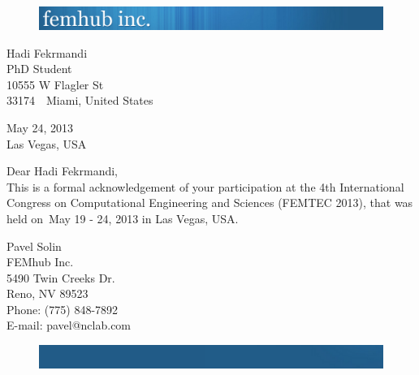 \documentclass[12pt]{article}
\makeatletter
\newcommand{\certificate}[6]
{
	\begin{figure}[h!]
		\includegraphics[width=\textwidth]{femhub_logo.png}
	\end{figure}

	\vspace{50pt}
	
	\noindent
	{#1}\\
	{#2}\\
	{#3}\\
	{#4}\ \ {#5}, {#6}\\
	\vspace{50pt}
	
	\begin{flushright}
		May 24, 2013\\
		Las Vegas, USA
	\end{flushright}
	\vspace{30pt}
	
	\noindent Dear {#1},\\

	This is a formal acknowledgement of your participation at the 4th International Congress on Computational Engineering and Sciences (FEMTEC 2013), that was held on~May 19 - 24, 2013 in Las Vegas, USA.
	\vspace{100pt}

	\noindent
	Pavel Solin\\
	FEMhub Inc.\\
	5490 Twin Creeks Dr.\\
	Reno, NV 89523\\
	Phone: (775) 848-7892\\
	E-mail: pavel@nclab.com\\
	
	\begin{figure}[h!]
		\includegraphics[width=\textwidth]{femhub_footer.png}
	\end{figure}
	\newpage
}
\makeatother
\begin{document}
\pagestyle{empty}

\certificate{Hadi Fekrmandi}{PhD Student}{10555 W Flagler St}{33174}{Miami}{United States}
\end{document}

